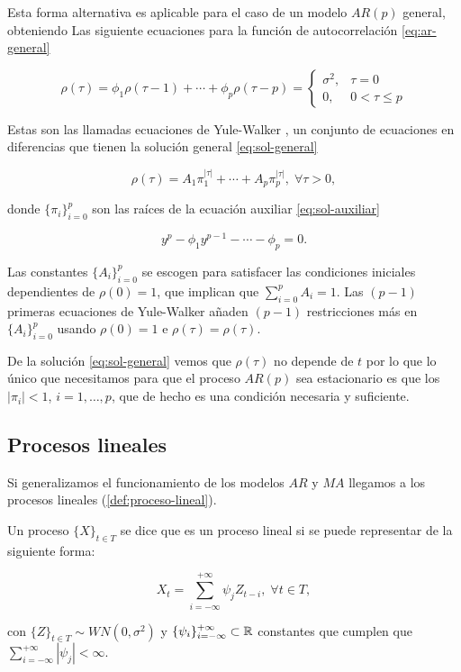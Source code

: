 Esta forma alternativa es aplicable para el caso de un modelo $AR(p)$ general, obteniendo Las siguiente ecuaciones para la función de autocorrelación \eqref{eq:ar-general}

\begin{equation}
  \rho(\tau) = \phi_1 \rho(\tau - 1) + \cdots + \phi_p \rho(\tau - p) =
  \begin{cases}
    \sigma^2, & \tau = 0 \\
    0, & 0 < \tau \leq p
  \end{cases}
  \label{eq:ar-general}
\end{equation}

Estas son las llamadas ecuaciones de Yule-Walker \cite{yule1971method, walker1931periodicity}, un conjunto de ecuaciones en diferencias que tienen la solución general \eqref{eq:sol-general}

\begin{equation}
  \rho(\tau) = A_1 \pi_1^{|\tau|} + \cdots + A_p \pi_p^{|\tau|}, \; \forall \tau > 0,
  \label{eq:sol-general}
\end{equation}

donde $\{\pi_i\}_{i = 0}^p$ son las raíces de la ecuación auxiliar \eqref{eq:sol-auxiliar}

\begin{equation}
  y^p - \phi_1 y^{p-1} - \cdots - \phi_p = 0.
  \label{eq:sol-auxiliar}
\end{equation}

Las constantes $\{A_i\}_{i = 0}^p$ se escogen para satisfacer las condiciones iniciales dependientes de $\rho(0) = 1$, que implican que $\sum_{i = 0}^p A_i = 1$. Las $(p - 1)$ primeras ecuaciones de Yule-Walker añaden $(p-1)$ restricciones más en $\{A_i\}_{i = 0}^p$ usando $\rho(0) = 1$ e $\rho(\tau) = \rho(\tau)$.

De la solución \eqref{eq:sol-general} vemos que $\rho(\tau)$ no depende de $t$ por lo que lo único que necesitamos para que el proceso $AR(p)$ sea estacionario es que los $|\pi_i| < 1$, $i = 1, \ldots, p$, que de hecho es una condición necesaria y suficiente.

\subsection{Procesos lineales}

Si generalizamos el funcionamiento de los modelos $AR$ y $MA$ llegamos a los procesos lineales (\autoref{def:proceso-lineal}).

\begin{definicion}
  Un proceso $\{X\}_{t \in T}$ se dice que es un proceso lineal si se puede representar de la siguiente forma:

  $$X_t = \sum \limits^{+\infty}_{i = -\infty} \psi_{j} Z_{t - i}, \; \forall t \in T,$$

  con $\{Z\}_{t \in T} \sim WN(0, \sigma^2)$ y $\{\psi_i\}^{+\infty}_{i = -\infty} \subset \mathbb{R}$ constantes que cumplen que $\sum \limits^{+\infty}_{i = -\infty} |\psi_j| < \infty$.
  \label{def:proceso-lineal}
\end{definicion}

